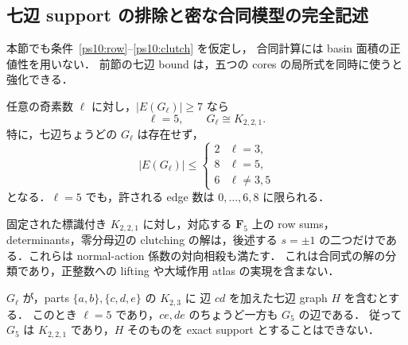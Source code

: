 
\subsection{七辺 support の排除と密な合同模型の完全記述}
\label{ps11:dense-section}

本節でも条件~\eqref{ps10:row}--\eqref{ps10:clutch} を仮定し，
合同計算には basin 面積の正値性を用いない．
前節の七辺 bound は，五つの cores の局所式を同時に使うと強化できる．

\begin{theorem}\label{ps11:dense}
任意の奇素数 $\ell$ に対し，$|E(G_\ell)|\ge7$ なら
\[
 \ell=5,\qquad G_\ell\cong K_{2,2,1}.
\]
特に，七辺ちょうどの $G_\ell$ は存在せず，
\begin{equation}\label{ps11:bounds}
 |E(G_\ell)|\le
 \begin{cases}
 2&\ell=3,\\
 8&\ell=5,\\
 6&\ell\ne3,5
 \end{cases}
\end{equation}
となる．$\ell=5$ でも，許される edge 数は $0,\ldots,6,8$ に限られる．

固定された標識付き $K_{2,2,1}$ に対し，対応する $\mathbf F_5$ 上の
row sums，determinants，零分母辺の clutching の解は，後述する
$s=\pm1$ の二つだけである．これらは normal-action 係数の対向相殺も満たす．
これは合同式の解の分類であり，正整数への lifting や大域作用 atlas の実現を含まない．
\end{theorem}

\begin{lemma}\label{ps11:seven-bipartite}
$G_\ell$ が，parts $\{a,b\},\{c,d,e\}$ の $K_{2,3}$ に
辺 $cd$ を加えた七辺 graph $H$ を含むとする．
このとき $\ell=5$ であり，$ce,de$ のちょうど一方も $G_5$ の辺である．
従って $G_5$ は $K_{2,2,1}$ であり，$H$ そのものを exact support とすることはできない．
\end{lemma}

